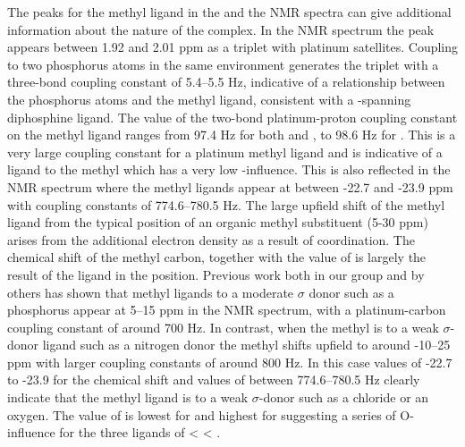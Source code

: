 The peaks for the methyl ligand in the \proton{} and the \carbon{} NMR spectra can give additional information about the nature of the complex.  In the \proton{} NMR spectrum the peak appears between 1.92 and 2.01 ppm as a triplet with platinum satellites.  Coupling to two phosphorus atoms in the same environment generates the triplet with a three-bond \JPH{} coupling constant of 5.4--5.5 Hz, indicative of a \cis{} relationship between the phosphorus atoms and the methyl ligand, consistent with a \trans-spanning diphosphine ligand.  The value of the two-bond platinum-proton coupling constant on the methyl ligand ranges from 97.4 Hz for both \tBuxantphos{} and \tButhixantphos{}, to 98.6 Hz for \tBusixantphos.  This is a very large coupling constant for a platinum methyl ligand and is indicative of a ligand \trans{} to the methyl which has a very low \trans{}-influence.  This is also reflected in the \carbon{} NMR spectrum where the methyl ligands appear at between -22.7 and -23.9 ppm with coupling constants of 774.6--780.5 Hz.  The large upfield shift of the methyl ligand from the typical position of an organic methyl substituent (5-30 ppm\cite{Silverstein2005}) arises from the additional electron density as a result of coordination.  The chemical shift of the methyl carbon, together with the value of \JPC{} is largely the result of the ligand in the \trans{} position.  Previous work both in our group\cite{Zayya2012, Zayya2012b} and by others\cite{Scollard2001} has shown that methyl ligands \trans{} to a moderate $\sigma$ donor such as a phosphorus appear at 5--15 ppm in the \carbon{} NMR spectrum, with a platinum-carbon coupling constant of around 700 Hz.  In contrast, when the methyl is \trans{} to a weak $\sigma$-donor ligand such as a nitrogen donor the methyl shifts upfield to around -10--25 ppm with larger coupling constants of around 800 Hz.  In this case values of -22.7 to -23.9 for the \carbon{} chemical shift and values of \JPtC{} between 774.6--780.5 Hz clearly indicate that the methyl ligand is \trans{} to a weak $\sigma$-donor such as a chloride or an oxygen.  The value of \JPtC{} is lowest for \tBuxantphos{} and highest for \tBusixantphos{} suggesting a series of O-\trans{} influence for the three ligands of \tBusixantphos{} \textless{} \tButhixantphos{} \textless{} \tBuxantphos{}.


